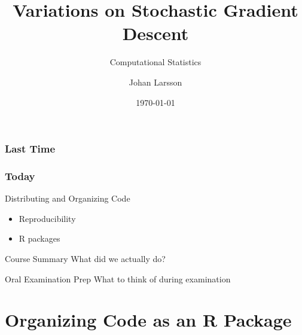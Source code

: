 \documentclass[aspectratio=1610,onlytextwidth]{beamer}
\date{\today}
\title{Variations on Stochastic Gradient Descent}
\subtitle{Computational Statistics}
\author{Johan Larsson}
\institute{Department of Mathematical Sciences, University of Copenhagen}
\begin{document}
\maketitle

%
%

\begin{frame}[c]
  \frametitle{Last Time}

\end{frame}

\begin{frame}[c]
  \frametitle{Today}

  \begin{block}{Distributing and Organizing Code}

    \begin{itemize}
      \item Reproducibility
      \item R packages
    \end{itemize}

  \end{block}

  \pause

  \begin{block}{Course Summary}
    What did we actually do?
  \end{block}

  \pause

  \begin{block}{Oral Examination Prep}
    What to think of during examination
  \end{block}
\end{frame}

\section{Organizing Code as an R Package}
\end{document}
